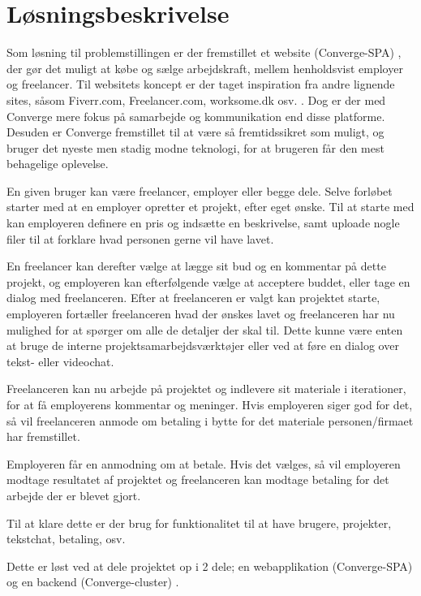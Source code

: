 \section{Løsningsbeskrivelse}

Som løsning til problemstillingen er der fremstillet et website (Converge-SPA) \cite[Converge-SPA]{converge-terms}, der gør det muligt at købe og sælge arbejdskraft, mellem henholdsvist employer og freelancer. Til websitets koncept er der taget inspiration fra andre lignende sites, såsom Fiverr.com, Freelancer.com, worksome.dk osv. \cite[Inspiration sites]{converge-terms}. Dog er der med Converge mere fokus på samarbejde og kommunikation end disse platforme. Desuden er Converge fremstillet til at være så fremtidssikret som muligt, og bruger det nyeste men stadig modne teknologi, for at brugeren får den mest behagelige oplevelse.

En given bruger kan være freelancer, employer eller begge dele. Selve forløbet starter med at en employer opretter et projekt, efter eget ønske. Til at starte med kan employeren definere en pris og indsætte en beskrivelse, samt uploade nogle filer til at forklare hvad personen gerne vil have lavet.

En freelancer kan derefter vælge at lægge sit bud og en kommentar på dette projekt, og employeren kan efterfølgende vælge at acceptere buddet, eller tage en dialog med freelanceren. Efter at freelanceren er valgt kan projektet starte, employeren fortæller freelanceren hvad der ønskes lavet og freelanceren har nu mulighed for at spørger om alle de detaljer der skal til. Dette kunne være enten at bruge de interne projektsamarbejdsværktøjer eller ved at føre en dialog over tekst- eller videochat.

Freelanceren kan nu arbejde på projektet og indlevere sit materiale i iterationer, for at få employerens kommentar og meninger. Hvis employeren siger god for det, så vil freelanceren anmode om betaling i bytte for det materiale personen/firmaet har fremstillet.

Employeren får en anmodning om at betale. Hvis det vælges, så vil employeren modtage resultatet af projektet og freelanceren kan modtage betaling for det arbejde der er blevet gjort.

Til at klare dette er der brug for funktionalitet til at have brugere, projekter, tekstchat, betaling, osv.

Dette er løst ved at dele projektet op i 2 dele; en webapplikation (Converge-SPA) og en backend (Converge-cluster) \cite[Converge-cluster]{converge-terms}.

